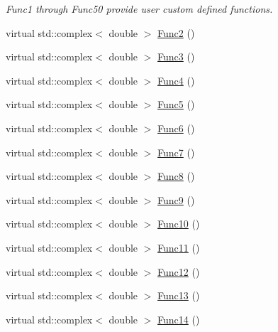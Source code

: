\begin{DoxyCompactItemize}
\begin{DoxyCompactList}\small\item\em Func1 through Func50 provide user custom defined functions. \end{DoxyCompactList}\item 
virtual std\-::complex$<$ double $>$ \hyperlink{classosea_1_1ofreq_1_1_equationof_motion_accd87271595a2eac0dc116285479ecff}{Func2} ()
\item 
virtual std\-::complex$<$ double $>$ \hyperlink{classosea_1_1ofreq_1_1_equationof_motion_ad63157443d3a7b67ec961a8642f895e4}{Func3} ()
\item 
virtual std\-::complex$<$ double $>$ \hyperlink{classosea_1_1ofreq_1_1_equationof_motion_a6e604ceb9f5147327d51099ca9cc862b}{Func4} ()
\item 
virtual std\-::complex$<$ double $>$ \hyperlink{classosea_1_1ofreq_1_1_equationof_motion_af8950ca2b293588b39b169bc18f6864d}{Func5} ()
\item 
virtual std\-::complex$<$ double $>$ \hyperlink{classosea_1_1ofreq_1_1_equationof_motion_aecb9d2662b2fc77143649ebbeaddb5af}{Func6} ()
\item 
virtual std\-::complex$<$ double $>$ \hyperlink{classosea_1_1ofreq_1_1_equationof_motion_a99c266e01afc3f20b7154db38344a050}{Func7} ()
\item 
virtual std\-::complex$<$ double $>$ \hyperlink{classosea_1_1ofreq_1_1_equationof_motion_a20b071061e22794f809e8e4a711385a9}{Func8} ()
\item 
virtual std\-::complex$<$ double $>$ \hyperlink{classosea_1_1ofreq_1_1_equationof_motion_aa5544ff6b4afe0982124ba173392cde6}{Func9} ()
\item 
virtual std\-::complex$<$ double $>$ \hyperlink{classosea_1_1ofreq_1_1_equationof_motion_a9d087d68b0af5a5c923cf624ba2ca25d}{Func10} ()
\item 
virtual std\-::complex$<$ double $>$ \hyperlink{classosea_1_1ofreq_1_1_equationof_motion_a93650f458441e585dbe6bae34934a5ca}{Func11} ()
\item 
virtual std\-::complex$<$ double $>$ \hyperlink{classosea_1_1ofreq_1_1_equationof_motion_a73499ca765a883d14483f0894cb99d6b}{Func12} ()
\item 
virtual std\-::complex$<$ double $>$ \hyperlink{classosea_1_1ofreq_1_1_equationof_motion_ab0a6e7f35c1ee774c67c348f63218161}{Func13} ()
\item 
virtual std\-::complex$<$ double $>$ \hyperlink{classosea_1_1ofreq_1_1_equationof_motion_a95dd987ce8564fc96f3c4dfd1b00da72}{Func14} ()
\item 

\end{DoxyCompactItemize}
